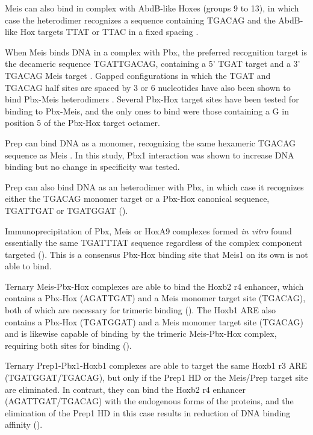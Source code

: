 Meis can also bind in complex with AbdB-like Hoxes (groups 9 to 13), in which case the heterodimer recognizes a sequence containing TGACAG and the AbdB-like Hox targets TTAT or TTAC in a fixed spacing \parencite{Shen1997}.

When Meis binds DNA in a complex with Pbx, the preferred recognition target is the decameric sequence TGATTGACAG, containing a 5' TGAT target and a 3' TGACAG Meis target \parencite{Chang1997, Knoepfler1997}. Gapped configurations in which the TGAT and TGACAG half sites are spaced by 3 or 6 nucleotides have also been shown to bind Pbx-Meis heterodimers \parencite{Jacobs1999}. Several Pbx-Hox target sites have been tested for binding to Pbx-Meis, and the only ones to bind were those containing a G in position 5 of the Pbx-Hox target octamer. %

Prep can bind DNA as a monomer, recognizing the same hexameric TGACAG sequence as Meis \parencite{Berthelsen1998a}. In this study, Pbx1 interaction was shown to increase DNA binding but no change in specificity was tested.

Prep can also bind DNA as an heterodimer with Pbx, in which case it recognizes either the TGACAG monomer target or a Pbx-Hox canonical sequence, TGATTGAT or TGATGGAT (\cite{Berthelsen1998}).%




Immunoprecipitation of Pbx, Meis or HoxA9 complexes formed \textit{in vitro} found essentially the same TGATTTAT sequence regardless of the complex component targeted (\cite{Shen1999}). This is a consensus Pbx-Hox binding site that Meis1 on its own is not able to bind.

Ternary Meis-Pbx-Hox complexes are able to bind the Hoxb2 r4 enhancer, which contains a Pbx-Hox (AGATTGAT) and a Meis monomer target site (TGACAG), both of which are necessary for trimeric binding (\cite{Jacobs1999}). The Hoxb1 \ac{ARE} also contains a Pbx-Hox (TGATGGAT) and a Meis monomer target site (TGACAG) and is likewise capable of binding by the trimeric Meis-Pbx-Hox complex, requiring both sites for binding (\cite{Jacobs1999}).

Ternary Prep1-Pbx1-Hoxb1 complexes are able to target the same Hoxb1 r3 \ac{ARE} (TGATGGAT/TGACAG), but only if the Prep1 \ac{HD} or the Meis/Prep target site are eliminated. In contrast, they can bind the Hoxb2 r4 enhancer (AGATTGAT/TGACAG) with the endogenous forms of the proteins, and the elimination of the Prep1 \ac{HD} in this case results in reduction of DNA binding affinity (\cite{Ferretti2000}).

